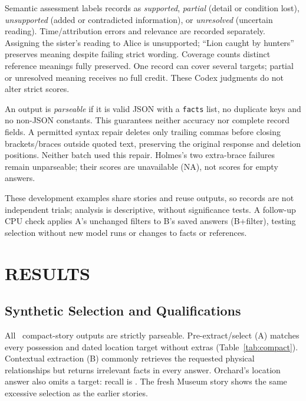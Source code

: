 \documentclass[a4paper,twoside]{article}
\begin{document}
Semantic assessment labels records as \emph{supported}, \emph{partial} (detail or condition lost), \emph{unsupported} (added or contradicted information), or \emph{unresolved} (uncertain reading). Time/attribution errors and relevance are recorded separately. Assigning the sister's reading to Alice is unsupported; ``Lion caught by hunters'' preserves meaning despite failing strict wording. Coverage counts distinct reference meanings fully preserved. One record can cover several targets; partial or unresolved meaning receives no full credit. These Codex judgments do not alter strict scores.

An output is \emph{parseable} if it is valid JSON with a \texttt{facts} list, no duplicate keys and no non-JSON constants. This guarantees neither accuracy nor complete record fields. A permitted syntax repair deletes only trailing commas before closing brackets/braces outside quoted text, preserving the original response and deletion positions. Neither batch used this repair. Holmes's two extra-brace failures remain unparseable; their scores are unavailable (NA), not scores for empty answers.

These development examples share stories and reuse outputs, so records are not independent trials; analysis is descriptive, without significance tests. A follow-up CPU check applies A's unchanged filters to B's saved answers (B+filter), testing selection without new model runs or changes to facts or references.

\AliceFigure






\section{\uppercase{Results}}

\subsection{Synthetic Selection and Qualifications}
\noindent All \CompactCalls\ compact-story outputs are strictly parseable. Pre-extract/select (A) matches every possession and dated location target without extras (Table~\ref{tab:compact}). Contextual extraction (B) commonly retrieves the requested physical relationships but returns irrelevant facts in every answer. Orchard's location answer also omits a target: recall is \OrchardLocationRecall. The fresh Museum story shows the same excessive selection as the earlier stories.
\end{document}
